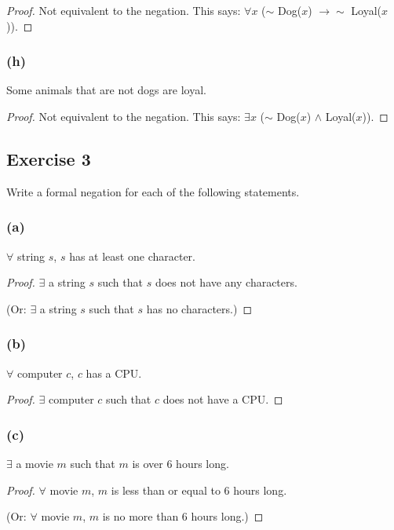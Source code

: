 \documentclass[14pt]{extarticle}
\newcommand{\fa}{\forall}
\newcommand{\te}{\exists}
\begin{document}
\begin{proof}
Not equivalent to the negation. This says: $\fa x$ ($\sim$ Dog($x$) $\to\sim$ Loyal($x$)).
\end{proof}

\subsubsection{(h)}
Some animals that are not dogs are loyal.

\begin{proof}
Not equivalent to the negation. This says: $\te x$ ($\sim$ Dog($x$) $\wedge$ Loyal($x$)).
\end{proof}

\subsection{Exercise 3}
Write a formal negation for each of the following statements.

\subsubsection{(a)}
$\fa$ string $s$, $s$ has at least one character.

\begin{proof}
$\te$ a string $s$ such that $s$ does not have any characters.

(Or: $\te$ a string $s$ such that $s$ has no characters.)
\end{proof}

\subsubsection{(b)}
$\fa$ computer $c$, $c$ has a CPU.

\begin{proof}
$\te$ computer $c$ such that $c$ does not have a CPU.
\end{proof}

\subsubsection{(c)}
$\te$ a movie $m$ such that $m$ is over 6 hours long.

\begin{proof}
$\fa$ movie $m$, $m$ is less than or equal to 6 hours long.

(Or: $\fa$ movie $m$, $m$ is no more than 6 hours long.)
\end{proof}
\end{document}
